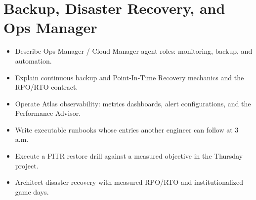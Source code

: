 \chapter{Backup, Disaster Recovery, and Ops Manager}
%

\begin{objectives}
\begin{itemize}
    \item Describe Ops Manager / Cloud Manager agent roles: monitoring, backup, and automation.
    \item Explain continuous backup and Point-In-Time Recovery mechanics and the RPO/RTO contract.
    \item Operate Atlas observability: metrics dashboards, alert configurations, and the Performance Advisor.
    \item Write executable runbooks whose entries another engineer can follow at 3 a.m.
    \item Execute a PITR restore drill against a measured objective in the Thursday project.
    \item Architect disaster recovery with measured RPO/RTO and institutionalized game days.
\end{itemize}
\end{objectives}

